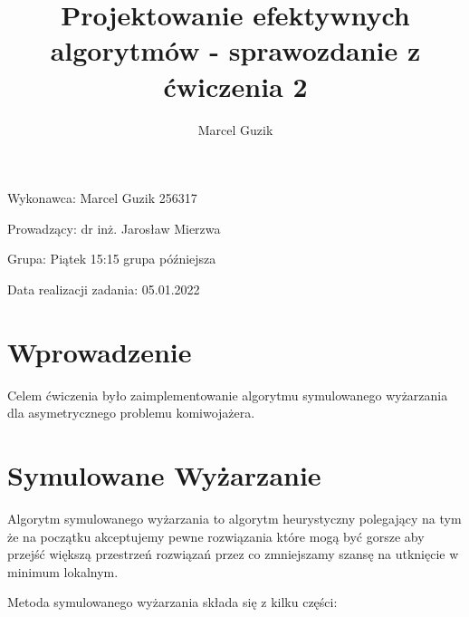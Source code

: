 \documentclass[a4paper]{article}
\title{Projektowanie efektywnych algorytmów - sprawozdanie z ćwiczenia 2}
\author{Marcel Guzik}
\begin{document}
\maketitle

Wykonawca: Marcel Guzik 256317

Prowadzący: dr inż. Jarosław Mierzwa

Grupa: Piątek 15:15 grupa późniejsza

Data realizacji zadania: 05.01.2022

\section{Wprowadzenie}

Celem ćwiczenia było zaimplementowanie algorytmu symulowanego wyżarzania dla
asymetrycznego problemu komiwojażera.

\section{Symulowane Wyżarzanie}

Algorytm symulowanego wyżarzania to algorytm heurystyczny polegający na tym że
na początku akceptujemy pewne rozwiązania które mogą być gorsze aby przejść
większą przestrzeń rozwiązań przez co zmniejszamy szansę na utknięcie w minimum
lokalnym.

Metoda symulowanego wyżarzania składa się z kilku części:
\end{document}
